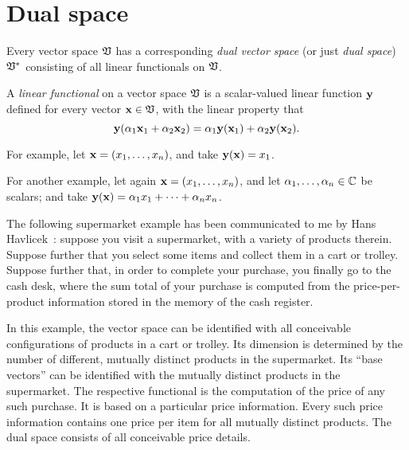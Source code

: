 




\section{Dual space}
\label{2011-m-dvs}

Every vector space ${\frak V}$
has a corresponding {\em dual vector space}
(or just {\em dual space})   ${\frak V}^\ast$
consisting of all linear functionals on ${\frak V}$.

A {\em linear functional}
on a vector space ${\frak V}$ is a scalar-valued linear function ${\bf y}$
defined for every vector   ${\bf x} \in {\frak V}$, with the linear property that
\begin{equation}
{\bf y} (\alpha_1 {\bf x}_1 +\alpha_2 {\bf x}_2)
=
\alpha_1 {\bf y} ({\bf x}_1) +\alpha_2 {\bf y} ({\bf x}_2) .
\end{equation}

{\color{blue}
\bexample
For example,
let ${\bf x} = (x_1,\ldots , x_n)$, and
take
${\bf y} ({\bf x}) =x_1$.

For another example,
let again ${\bf x} = (x_1,\ldots , x_n)$, and
let $\alpha_1,\ldots , \alpha_n \in {\Bbb C}$ be scalars; and
take
${\bf y} ({\bf x}) =\alpha_1 x_1 + \cdots +\alpha_n x_n$.

The following supermarket example has been
communicated to me by Hans Havlicek~\cite{havlicek-priv3}:
suppose you visit a supermarket, with a variety of products therein.
Suppose further that you select some items and collect them in a cart or trolley.
Suppose further that, in order to complete your purchase, you finally go to the cash desk,
where the sum total of your purchase is computed from the price-per-product information stored
in the memory of the cash register.

In this example, the vector space can be identified with all conceivable configurations of products in a cart or trolley.
Its dimension is determined by the number of different, mutually distinct products in the supermarket.
Its ``base vectors'' can be identified with the mutually distinct products in the supermarket.
The respective functional is the computation of the price of any such purchase.
It is based on a particular price information.
Every such price information contains one price per item for all mutually distinct products.
The dual space consists of all conceivable price details.
\eexample
}


